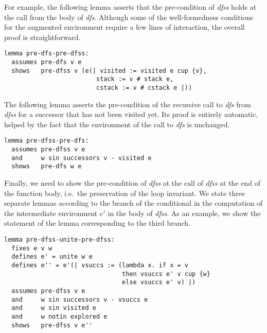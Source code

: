 \documentclass[sigplan,10pt,anonymous,review]{acmart}
\newcommand{\prog}[1]{\textit{#1}}
\begin{document}
For example, the following lemma asserts that the pre-condition of \prog{dfss} holds at the call from the body of \prog{dfs}. Although some of the well-formedness conditions for the augmented environment require a few lines of interaction, the overall proof is straightforward.

\begin{small}
\begin{lstlisting}[language=isabelle]
lemma pre-dfs-pre-dfss:
  assumes pre-dfs v e
  shows   pre-dfss v (e(| visited := visited e cup {v},
                         stack := v # stack e,
                         cstack := v # cstack e |))
\end{lstlisting}
\end{small}

The following lemma asserts the pre-condition of the recursive call to \prog{dfs} from \prog{dfss} for a successor that has not been visited yet. Its proof is entirely automatic, helped by the fact that the environment of the call to \prog{dfs} is unchanged.

\begin{small}
\begin{lstlisting}[language=isabelle]
lemma pre-dfss-pre-dfs:
  assumes pre-dfss v e
  and     w sin successors v - visited e
  shows   pre-dfs w e
\end{lstlisting}
\end{small}

Finally, we need to show the pre-condition of \prog{dfss} at the call of \prog{dfss} at the end of the function body, i.e.\ the preservation of the loop invariant. We state three separate lemmas according to the branch of the conditional in the computation of the intermediate environment $e'$ in the body of \prog{dfss}. As an example, we show the statement of the lemma corresponding to the third branch.

\begin{small}
\begin{lstlisting}[language=isabelle]
lemma pre-dfss-unite-pre-dfss:
  fixes e v w
  defines e' = unite w e
  defines e'' = e'(| vsuccs := (lambda x. if x = v 
                                then vsuccs e' v cup {w}
                                else vsuccs e' v) |)
  assumes pre-dfss v e
  and     w sin successors v - vsuccs e
  and     w sin visited e
  and     w notin explored e
  shows   pre-dfss v e''
\end{lstlisting}
\end{small}
\end{document}

